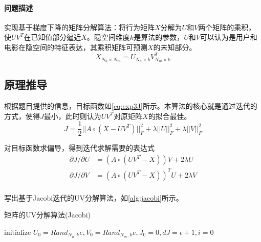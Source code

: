 \documentclass[a4paper,12pt]{article}
\begin{document}
    \paragraph{问题描述}
    实现基于梯度下降的矩阵分解算法：将行为矩阵$X$分解为$U$和$V$两个矩阵的乘积，使$UV^T$在已知值部分逼近$X$。隐空间维度$k$是算法的参数，$U$和$V$可以认为是用户和电影在隐空间的特征表达，其乘积矩阵可预测$X$的未知部分。
    $$
      X_{N_u\times N_m} = U_{N_u\times k}V_{N_m\times k}^T
    $$
    \subsection{原理推导}
    根据题目提供的信息，目标函数如\cref{eq:exp3J}所示。本算法的核心就是通过迭代的方式，使得$J$最小，此时则认为$UV^T$对原矩阵$X$的拟合最佳。
    \begin{equation}
      \label{eq:exp3J}
      J =\frac{1}{2} ||A\circ (X-UV^T)||_F^2 + \lambda ||U||_F^2 + \lambda ||V||_F^2
    \end{equation}

    对目标函数求偏导，得到迭代求解需要的表达式
    \begin{equation}
      \begin{aligned}
        \partial J/\partial U &= (A\circ (UV^T-X))V + 2\lambda U\\
        \partial J/\partial V &= (A\circ (UV^T-X))^TU + 2\lambda V\\
      \end{aligned}
    \end{equation}

    写出基于Jacobi迭代的UV分解算法，如\cref{alg:jacobi}所示。
    \begin{algorithm}
        \caption{矩阵的UV分解算法(Jacobi)}
        \label{alg:jacobi}

        initialize $U_0=Rand_{N_u,k}e, V_0=Rand_{N_m,k}e, J_0=0, dJ = \epsilon + 1, i=0$\;
    \end{algorithm}
\end{document}
